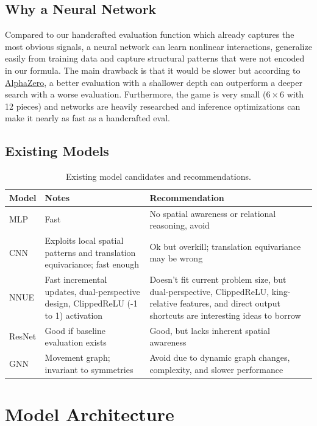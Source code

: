 \documentclass[11pt,a4paper]{article}
\begin{document}
\subsection{Why a Neural Network}
Compared to our handcrafted evaluation function which already captures the most obvious signals, a neural network can learn nonlinear interactions, generalize easily from training data and capture structural patterns that were not encoded in our formula.
The main drawback is that it would be slower but according to \href{https://arxiv.org/abs/1712.01815}{AlphaZero}, a better evaluation with a shallower depth can outperform a deeper search with a worse evaluation. Furthermore, the game is very small ($6\times6$ with 12 pieces) and networks are heavily researched and inference optimizations can make it nearly as fast as a handcrafted eval.

\newpage
\subsection{Existing Models}
\begin{table}[htbp]
  \centering
  \begin{tabular}{L{0.12\textwidth} L{0.53\textwidth} L{0.27\textwidth}}
    \toprule
    Model & Notes & Recommendation \\
    \midrule
    MLP & Fast & No spatial awareness or relational reasoning, avoid \\
    CNN & Exploits local spatial patterns and translation equivariance; fast enough & Ok but overkill; translation equivariance may be wrong \\
    NNUE & Fast incremental updates, dual-perspective design, ClippedReLU (-1 to 1) activation & Doesn't fit current problem size, but dual-perspective, ClippedReLU, king-relative features, and direct output shortcuts are interesting ideas to borrow \\
    ResNet & Good if baseline evaluation exists & Good, but lacks inherent spatial awareness \\
    GNN & Movement graph; invariant to symmetries & Avoid due to dynamic graph changes, complexity, and slower performance \\
    \bottomrule
  \end{tabular}
    \caption{Existing model candidates and recommendations.}
    \label{tab:existing-models}
\end{table}

\clearpage
\section{Model Architecture}
\end{document}

